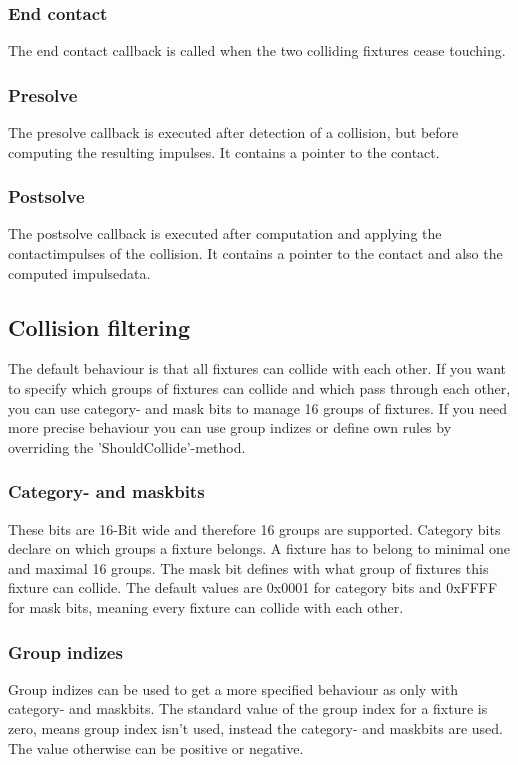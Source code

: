 \documentclass[10pt,a4paper,DIV=11]{scrreprt}
\begin{document}
\subsubsection*{End contact}
The end contact callback is called when the two colliding fixtures cease touching.

\subsubsection*{Presolve}
The presolve callback is executed after detection of a collision, but before computing the resulting impulses. It contains a pointer to the contact.

\subsubsection*{Postsolve}
The postsolve callback is executed after computation and applying the contactimpulses of the collision. It contains a pointer to the contact and also the computed impulsedata.

\subsection{Collision filtering}
The default behaviour is that all fixtures can collide with each other. If you want to specify which groups of fixtures can collide and which pass through each other, you can use category- and mask bits to manage 16 groups of fixtures. If you need more precise behaviour you can use group indizes or define own rules by overriding the 'ShouldCollide'-method.

\subsubsection*{Category- and maskbits}

These bits are 16-Bit wide and therefore 16 groups are supported.
Category bits declare on which groups a fixture belongs. A fixture has to belong to minimal one and maximal 16 groups.
The mask bit defines with what group of fixtures this fixture can collide. The default values are 0x0001 for category bits and 0xFFFF for mask bits, meaning every fixture can collide with each other.

\subsubsection*{Group indizes}
Group indizes can be used to get a more specified behaviour as only with category- and maskbits.
The standard value of the group index for a fixture is zero, means group index isn't used, instead the category- and maskbits are used. The value otherwise can be positive or negative.
\end{document}
